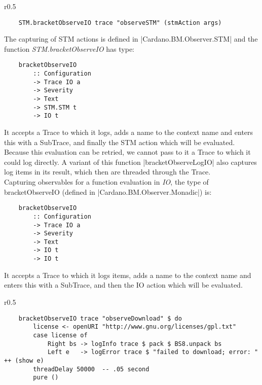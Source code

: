 \begin{wrapfigure}{r}{0.5\textwidth}
    \begin{center}\begin{scriptsize}\begin{verbatim}
    STM.bracketObserveIO trace "observeSTM" (stmAction args)
    \end{verbatim}\end{scriptsize}\end{center}
\end{wrapfigure}

The capturing of STM actions is defined in |Cardano.BM.Observer.STM| and the
function \emph{STM.bracketObserveIO} has type:
\begin{verbatim}
    bracketObserveIO
        :: Configuration
        -> Trace IO a
        -> Severity
        -> Text
        -> STM.STM t
        -> IO t
\end{verbatim}
It accepts a Trace to which it logs, adds a name to the context name and enters
this with a SubTrace, and finally the STM action which will be evaluated.
Because this evaluation can be retried, we cannot pass to it a Trace to which it
could log directly. A variant of this function |bracketObserveLogIO| also
captures log items in its result, which then are threaded through the Trace.
\\
Capturing observables for a function evaluation in \emph{IO}, the type of
\mbox{bracketObserveIO} (defined in |Cardano.BM.Observer.Monadic|) is:
\begin{verbatim}
    bracketObserveIO
        :: Configuration
        -> Trace IO a
        -> Severity
        -> Text
        -> IO t
        -> IO t
\end{verbatim}

It accepts a Trace to which it logs items, adds a name to the context name and
enters this with a SubTrace, and then the IO action which will be evaluated.

\begin{wrapfigure}{r}{0.5\textwidth}
    \vspace{-10pt}
    \begin{center}\begin{scriptsize}\begin{verbatim}
    bracketObserveIO trace "observeDownload" $ do
        license <- openURI "http://www.gnu.org/licenses/gpl.txt"
        case license of
            Right bs -> logInfo trace $ pack $ BS8.unpack bs
            Left e   -> logError trace $ "failed to download; error: " ++ (show e)
        threadDelay 50000  -- .05 second
        pure ()
    \end{verbatim}\end{scriptsize}\end{center}
  \end{wrapfigure}

